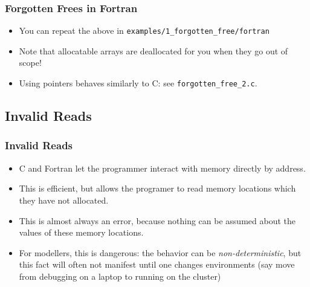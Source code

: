 \documentclass{beamer}
\begin{document}
\begin{frame}[fragile]
  \frametitle{Forgotten Frees in Fortran}
  \begin{itemize}
    \item You can repeat the above in \texttt{examples/1\_forgotten\_free/fortran}
      \item Note that allocatable arrays are deallocated for you when they go out of scope!
      \item Using pointers behaves similarly to C: see \texttt{forgotten\_free\_2.c}.
  \end{itemize}

\end{frame}


\subsection{Invalid Reads}

\begin{frame}[fragile]
  \frametitle{Invalid Reads}
  \begin{itemize}
    \item C and Fortran let the programmer interact with memory directly by address.
      \item This is efficient, but allows the programer to read memory locations which they have not allocated.
        \item This is almost always an error, because nothing can be assumed about the values of these memory locations.
        \item For modellers, this is dangerous: the behavior can be \emph{non-deterministic}, but this fact will often not manifest until one changes environments (say move from debugging on a laptop to running on the cluster)
  \end{itemize}
\end{frame}
\end{document}
